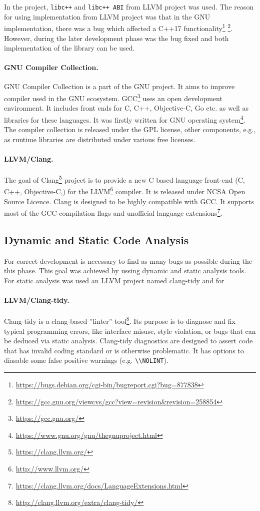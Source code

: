 In the project, \texttt{libc++} and \texttt{libc++ ABI} from LLVM project was
used. The reason for using implementation from LLVM project was that in the GNU
implementation, there was a bug which affected a C++17
functionality\footnote{\url{https://bugs.debian.org/cgi-bin/bugreport.cgi?bug=877838}}
\footnote{\url{https://gcc.gnu.org/viewcvs/gcc?view=revision&revision=258854}}.
However, during the later development phase was the bug fixed and both implementation
of the library can be used.

\paragraph{GNU Compiler Collection.}GNU Compiler Collection is a part of the GNU project.
It aims to improve compiler used in the GNU ecosystem.
GCC\footnote{\url{https://gcc.gnu.org/}} uses an open development environment.
It includes front ends for C, C++, Objective-C, Go etc.
as well as libraries for these languages. It was firstly written for GNU operating system\footnote{\url{https://www.gnu.org/gnu/thegnuproject.html}}.
The compiler collection is released under the GPL license, other components, e.g., as runtime libraries are distributed under various free licenses.

\paragraph{LLVM/Clang.}
The goal of Clang\footnote{\url{https://clang.llvm.org/}} project is to provide a new C based language front-end (C, C++, Objective-C,) for the LLVM\footnote{\url{http://www.llvm.org/}} compiler.
It is released under NCSA Open Source Licence. Clang is designed to be highly compatible with GCC.
It supports most of the GCC compilation flags and unofficial language extensions\footnote{\url{https://clang.llvm.org/docs/LanguageExtensions.html}}.

\subsection{Dynamic and Static Code Analysis}
For correct development is necessary to find as many bugs as possible during the this phase.
This goal was achieved by ussing dynamic and static analysis tools.
For static analysis was used an LLVM project named clang-tidy and for

\paragraph{LLVM/Clang-tidy.}
Clang-tidy is a clang-based ''linter'' tool\footnote{\url{http://clang.llvm.org/extra/clang-tidy/}}.
Its purpose is to diagnose and fix typical programming errors,
like interface misuse, style violation, or bugs that can be deduced via static analysis.
Clang-tidy diagnostics are designed to assert code that has invalid coding standard or is otherwise problematic.
It has options to diasable some false positive warnings (e.g. \texttt{\textbackslash\textbackslash NOLINT}).

